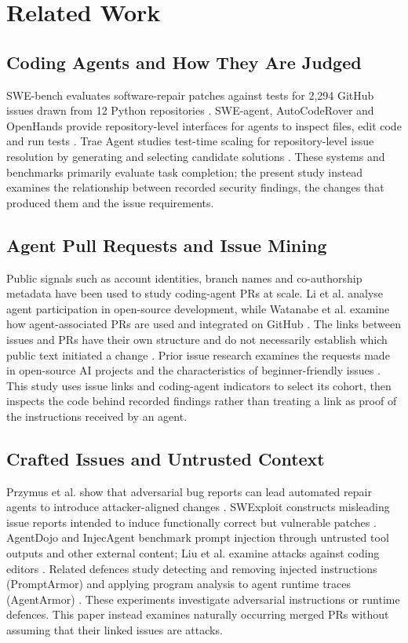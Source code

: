 \documentclass[acmsmall,screen,nonacm]{acmart}
\begin{document}
\section{Related Work}

\subsection{Coding Agents and How They Are Judged}

SWE-bench evaluates software-repair patches against tests for 2,294 GitHub issues drawn from 12 Python repositories \cite{b9}. SWE-agent, AutoCodeRover and OpenHands provide repository-level interfaces for agents to inspect files, edit code and run tests \cite{b22,b25,b20}. Trae Agent studies test-time scaling for repository-level issue resolution by generating and selecting candidate solutions \cite{b47}. These systems and benchmarks primarily evaluate task completion; the present study instead examines the relationship between recorded security findings, the changes that produced them and the issue requirements.

\subsection{Agent Pull Requests and Issue Mining}

Public signals such as account identities, branch names and co-authorship metadata have been used to study coding-agent PRs at scale. Li et al. analyse agent participation in open-source development, while Watanabe et al. examine how agent-associated PRs are used and integrated on GitHub \cite{b11,b21}. The links between issues and PRs have their own structure and do not necessarily establish which public text initiated a change \cite{b5}. Prior issue research examines the requests made in open-source AI projects and the characteristics of beginner-friendly issues \cite{b23,b26}. This study uses issue links and coding-agent indicators to select its cohort, then inspects the code behind recorded findings rather than treating a link as proof of the instructions received by an agent.

\subsection{Crafted Issues and Untrusted Context}

Przymus et al. show that adversarial bug reports can lead automated repair agents to introduce attacker-aligned changes \cite{b16}. SWExploit constructs misleading issue reports intended to induce functionally correct but vulnerable patches \cite{b3}. AgentDojo and InjecAgent benchmark prompt injection through untrusted tool outputs and other external content; Liu et al. examine attacks against coding editors \cite{b6,b24,b12}. Related defences study detecting and removing injected instructions (PromptArmor) and applying program analysis to agent runtime traces (AgentArmor) \cite{b45,b46}. These experiments investigate adversarial instructions or runtime defences. This paper instead examines naturally occurring merged PRs without assuming that their linked issues are attacks.
\end{document}
